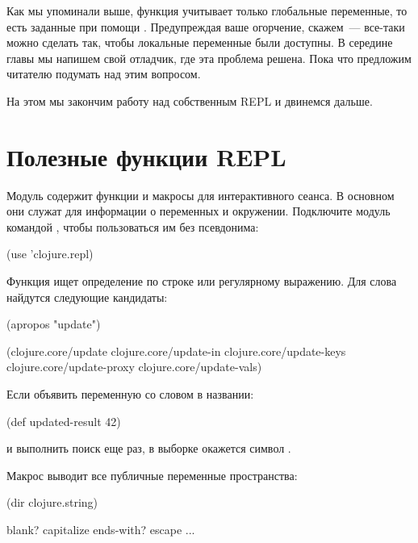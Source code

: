 Как мы упоминали выше, функция  учитывает только глобальные переменные, то есть заданные при помощи . Предупреждая ваше огорчение, скажем~--- все-таки можно сделать так, чтобы локальные переменные были доступны. В середине главы мы напишем свой отладчик, где эта проблема решена. Пока что предложим читателю подумать над этим вопросом.

На этом мы закончим работу над собственным REPL и двинемся дальше.

\section{Полезные функции REPL}

Модуль  содержит функции и макросы для интерактивного сеанса. В основном они служат для информации о переменных и окружении. Подключите модуль командой , чтобы пользоваться им без псевдонима:

\begin{english}
  \begin{clojure}
(use 'clojure.repl)
  \end{clojure}
\end{english}

Функция  ищет определение по строке или регулярному выражению. Для слова  найдутся следующие кандидаты:

\begin{english}
  \begin{clojure}
(apropos "update")

(clojure.core/update
 clojure.core/update-in
 clojure.core/update-keys
 clojure.core/update-proxy
 clojure.core/update-vals)
  \end{clojure}
\end{english}

Если объявить переменную со словом  в названии:

\begin{english}
  \begin{clojure}
(def updated-result 42)
  \end{clojure}
\end{english}

\noindent
и выполнить поиск еще раз, в выборке окажется символ .

Макрос  выводит все публичные переменные пространства:

\begin{english}
  \begin{clojure}
(dir clojure.string)

blank?
capitalize
ends-with?
escape
...
  \end{clojure}
\end{english}

